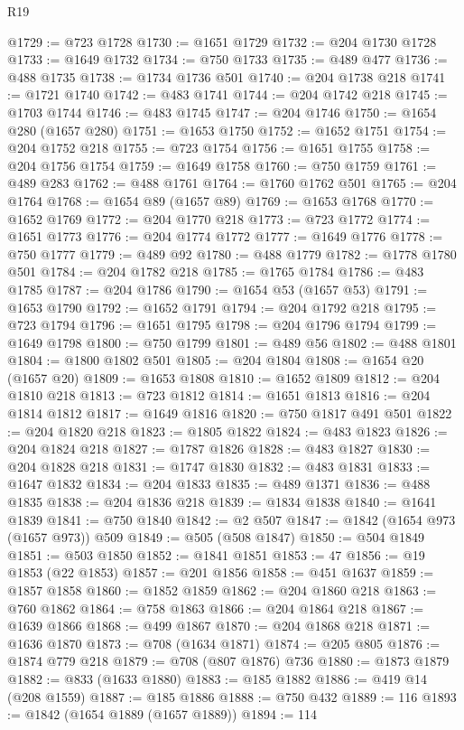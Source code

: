 \begin{lexlean}{R19}
\begin{coremodule}
{{{{{{@1729 := @723 @1728
@1730 := @1651 @1729
@1732 := @204 @1730 @1728
@1733 := @1649 @1732
@1734 := @750 @1733
@1735 := @489 @477
@1736 := @488 @1735
@1738 := @1734 @1736 @501
@1740 := @204 @1738 @218
@1741 := @1721 @1740
@1742 := @483 @1741
@1744 := @204 @1742 @218
@1745 := @1703 @1744
@1746 := @483 @1745
@1747 := @204 @1746
@1750 := @1654 @280 (@1657 @280)
@1751 := @1653 @1750
@1752 := @1652 @1751
@1754 := @204 @1752 @218
@1755 := @723 @1754
@1756 := @1651 @1755
@1758 := @204 @1756 @1754
@1759 := @1649 @1758
@1760 := @750 @1759
@1761 := @489 @283
@1762 := @488 @1761
@1764 := @1760 @1762 @501
@1765 := @204 @1764
@1768 := @1654 @89 (@1657 @89)
@1769 := @1653 @1768
@1770 := @1652 @1769
@1772 := @204 @1770 @218
@1773 := @723 @1772
@1774 := @1651 @1773
@1776 := @204 @1774 @1772
@1777 := @1649 @1776
@1778 := @750 @1777
@1779 := @489 @92
@1780 := @488 @1779
@1782 := @1778 @1780 @501
@1784 := @204 @1782 @218
@1785 := @1765 @1784
@1786 := @483 @1785
@1787 := @204 @1786
@1790 := @1654 @53 (@1657 @53)
@1791 := @1653 @1790
@1792 := @1652 @1791
@1794 := @204 @1792 @218
@1795 := @723 @1794
@1796 := @1651 @1795
@1798 := @204 @1796 @1794
@1799 := @1649 @1798
@1800 := @750 @1799
@1801 := @489 @56
@1802 := @488 @1801
@1804 := @1800 @1802 @501
@1805 := @204 @1804
@1808 := @1654 @20 (@1657 @20)
@1809 := @1653 @1808
@1810 := @1652 @1809
@1812 := @204 @1810 @218
@1813 := @723 @1812
@1814 := @1651 @1813
@1816 := @204 @1814 @1812
@1817 := @1649 @1816
@1820 := @750 @1817 @491 @501
@1822 := @204 @1820 @218
@1823 := @1805 @1822
@1824 := @483 @1823
@1826 := @204 @1824 @218
@1827 := @1787 @1826
@1828 := @483 @1827
@1830 := @204 @1828 @218
@1831 := @1747 @1830
@1832 := @483 @1831
@1833 := @1647 @1832
@1834 := @204 @1833
@1835 := @489 @1371
@1836 := @488 @1835
@1838 := @204 @1836 @218
@1839 := @1834 @1838
@1840 := @1641 @1839
@1841 := @750 @1840
@1842 := @2 @507
@1847 := @1842 (@1654 @973 (@1657 @973)) @509
@1849 := @505 (@508 @1847)
@1850 := @504 @1849
@1851 := @503 @1850
@1852 := @1841 @1851
@1853 := 47
@1856 := @19 @1853 (@22 @1853)
@1857 := @201 @1856
@1858 := @451 @1637
@1859 := @1857 @1858
@1860 := @1852 @1859
@1862 := @204 @1860 @218
@1863 := @760 @1862
@1864 := @758 @1863
@1866 := @204 @1864 @218
@1867 := @1639 @1866
@1868 := @499 @1867
@1870 := @204 @1868 @218
@1871 := @1636 @1870
@1873 := @708 (@1634 @1871)
@1874 := @205 @805
@1876 := @1874 @779 @218
@1879 := @708 (@807 @1876) @736
@1880 := @1873 @1879
@1882 := @833 (@1633 @1880)
@1883 := @185 @1882
@1886 := @419 @14 (@208 @1559)
@1887 := @185 @1886
@1888 := @750 @432
@1889 := 116
@1893 := @1842 (@1654 @1889 (@1657 @1889))
@1894 := 114
}}}}}}
\end{coremodule}
\end{lexlean}
